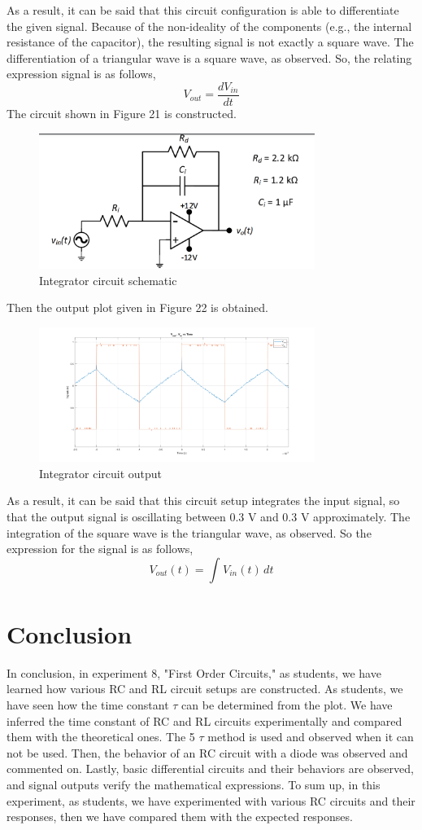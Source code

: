 \documentclass[letterpaper,12pt]{article}
\begin{document}
As a result, it can be said that this circuit configuration is able to differentiate the given signal. Because of the non-ideality of the components (e.g., the internal resistance of the capacitor), the resulting signal is not exactly a square wave. The differentiation of a triangular wave is a square wave, as observed. So, the relating expression signal is as follows,
\[V_{out} = \frac{dV_{in}}{dt}\]
\newline
The circuit shown in Figure 21 is constructed.
\begin{figure}[H]
	\centering
   \includegraphics[width=0.8\textwidth]{integrator.png}
   \caption{Integrator circuit schematic}
\end{figure} 
Then the output plot given in Figure 22 is obtained.
\begin{figure}[H]
	\centering
   \includegraphics[width=0.8\textwidth]{3.png}
   \caption{Integrator circuit output}
\end{figure} 
As a result, it can be said that this circuit setup integrates the input signal, so that the output signal is oscillating between 0.3 V and 0.3 V approximately. The integration of the square wave is the triangular wave, as observed. So the expression for the signal is as follows,
\[V_{out}(t) =  \int_{ }^{ }V_{in}(t) \,dt  \]
\section{Conclusion}

In conclusion, in experiment 8, "First Order Circuits," as students, we have learned how various RC and RL circuit setups are constructed. As students, we have seen how the time constant \(\tau\) can be determined from the plot. We have inferred the time constant of RC and RL circuits experimentally and compared them with the theoretical ones. The 5 \(\tau\) method is used and observed when it can not be used. Then, the behavior of an RC circuit with a diode was observed and commented on. Lastly, basic differential circuits and their behaviors are observed, and signal outputs verify the mathematical expressions. To sum up, in this experiment, as students, we have experimented with various RC circuits and their responses, then we have compared them with the expected responses. 
\end{document}
